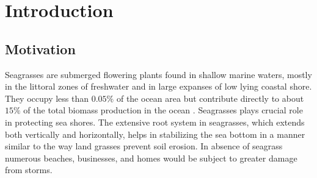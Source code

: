 \documentclass[12pt]{report}   %
\begin{document}
\pagestyle{myheadings}


\chapter{Introduction}
\section{Motivation}
Seagrasses are submerged flowering plants found in shallow marine waters, mostly in the littoral zones of freshwater and in large expanses of low lying coastal shore. They occupy less than $0.05\%$ of the ocean area \cite{green2003world} but contribute directly to about $15\%$ of the total biomass production in the ocean \cite{duarte1999}. Seagrasses plays crucial role in protecting sea shores. The extensive root system in seagrasses, which extends both vertically and horizontally, helps in stabilizing the sea bottom in a manner similar to the way land grasses prevent soil erosion. In absence of seagrass numerous beaches, businesses, and homes would be subject to greater damage from storms.
\end{document}
